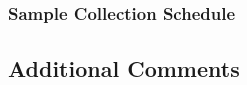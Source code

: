 
\subsubsection{Sample Collection Schedule}




\clearpage

\subsection{Additional Comments}


\clearpage

